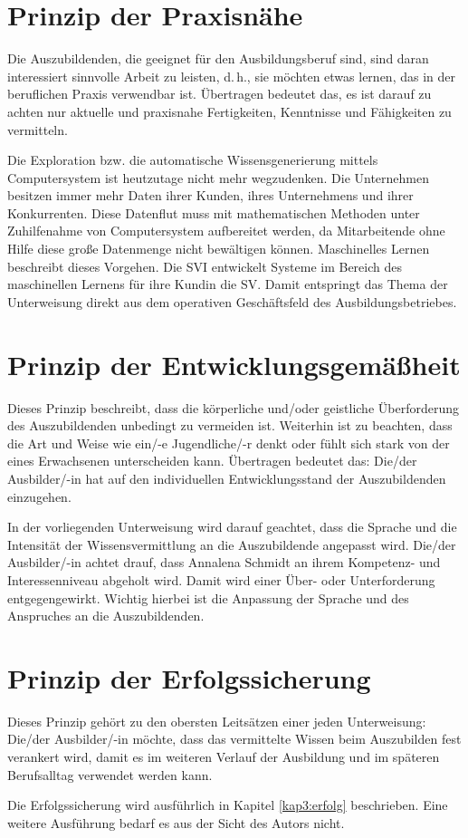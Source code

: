 \section{Prinzip der Praxisnähe}
Die Auszubildenden, die geeignet für den Ausbildungsberuf sind, sind daran interessiert sinnvolle Arbeit zu leisten, d.\,h., sie möchten etwas lernen, das in der beruflichen Praxis verwendbar ist. Übertragen bedeutet das, es ist darauf zu achten nur aktuelle und praxisnahe Fertigkeiten, Kenntnisse und Fähigkeiten zu vermitteln. 
\par
Die Exploration bzw. die automatische Wissensgenerierung mittels Computersystem ist heutzutage nicht mehr wegzudenken. Die Unternehmen besitzen immer mehr Daten ihrer Kunden, ihres Unternehmens und ihrer Konkurrenten.\autocite[vgl.][]{noauthor_hochschule_nodate}\autocite[vgl.][]{noauthor_volkswagen_nodate} Diese Datenflut muss mit mathematischen Methoden unter Zuhilfenahme von Computersystem aufbereitet werden, da Mitarbeitende ohne Hilfe diese große Datenmenge nicht bewältigen können. Maschinelles Lernen beschreibt dieses Vorgehen. Die \ac{SVI} entwickelt Systeme im Bereich des maschinellen Lernens für ihre Kundin die \ac{SV}. Damit entspringt das Thema der Unterweisung direkt aus dem operativen Geschäftsfeld des Ausbildungsbetriebes. 

\section{Prinzip der Entwicklungsgemäßheit}
Dieses Prinzip beschreibt, dass die körperliche und/oder geistliche Überforderung des Auszubildenden unbedingt zu vermeiden ist. Weiterhin ist zu beachten, dass die Art und Weise wie ein/-e Jugendliche/-r denkt oder fühlt sich stark von der eines Erwachsenen unterscheiden kann. Übertragen bedeutet das: Die/der Ausbilder/-in hat auf den individuellen Entwicklungsstand der Auszubildenden einzugehen. 
\par
In der vorliegenden Unterweisung wird darauf geachtet, dass die Sprache und die Intensität der Wissensvermittlung an die Auszubildende angepasst wird. Die/der Ausbilder/-in achtet drauf, dass Annalena Schmidt an ihrem Kompetenz- und Interessenniveau abgeholt wird. Damit wird einer Über- oder Unterforderung entgegengewirkt. Wichtig hierbei ist die Anpassung der Sprache und des Anspruches an die Auszubildenden.

\section{Prinzip der Erfolgssicherung}
Dieses Prinzip gehört zu den obersten Leitsätzen einer jeden Unterweisung: Die/der Ausbilder/-in möchte, dass das vermittelte Wissen beim Auszubilden fest verankert wird, damit es im weiteren Verlauf der Ausbildung und im späteren Berufsalltag verwendet werden kann. 
\par
Die Erfolgssicherung wird ausführlich in Kapitel \vref{kap3:erfolg} beschrieben. Eine weitere Ausführung bedarf es aus der Sicht des Autors nicht.

